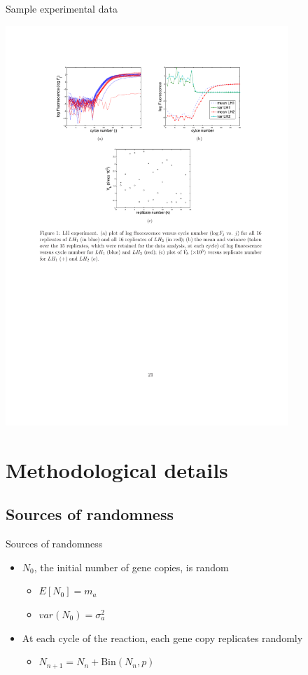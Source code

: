 \documentclass{beamer}
\begin{document}
\begin{frame}{Sample experimental data}
\begin{center}
  \includegraphics[width=0.8\textwidth]{figures/hanlon-fig0}
\end{center}
\end{frame}


\section{Methodological details}
\subsection{Sources of randomness}


\begin{frame}{Sources of randomness}
  \begin{itemize}
    \item $N_0$, the initial number of gene copies, is random
    \vspace{3mm}
    \begin{itemize}
      \item $E[N_0] = m_a$
      \vspace{3mm}
      \item $var(N_0) = \sigma_a^2$
      \vspace{3mm}
    \end{itemize}
    \item At each cycle of the reaction, each gene copy replicates randomly 
    \vspace{3mm}
    \begin{itemize}
      \item $N_{n+1} = N_n + \text{Bin}(N_n, p)$
    \end{itemize}
  \end{itemize}
\end{frame}
\end{document}
